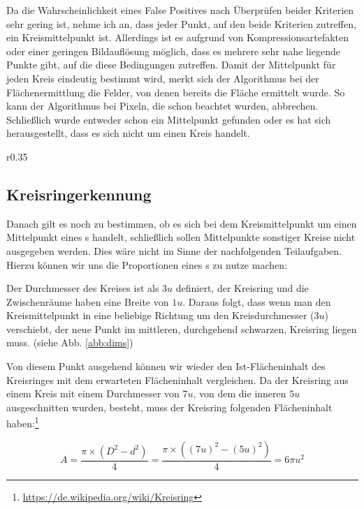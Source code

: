 Da die Wahrscheinlichkeit eines False Positives nach Überprüfen beider Kriterien sehr gering ist, nehme ich an, dass jeder Punkt, auf den beide Kriterien zutreffen, ein Kreismittelpunkt ist. 
Allerdings ist es aufgrund von Kompressionsartefakten oder einer geringen Bildauflösung möglich, dass es mehrere sehr nahe liegende Punkte gibt, auf die diese Bedingungen zutreffen. Damit der Mittelpunkt für jeden Kreis eindeutig bestimmt wird, merkt sich der Algorithmus bei der Flächenermittlung die Felder, von denen bereits die Fläche ermittelt wurde. 
So kann der Algorithmus bei Pixeln, die schon beachtet wurden, abbrechen. Schließlich wurde entweder schon ein Mittelpunkt gefunden oder es hat sich herausgestellt, dass es sich nicht um einen Kreis handelt.

\begin{wrapfigure}{r}{0.35\textwidth}
  \centering
  
  \caption{Größenverhältnisse}
  \label{abb:dims}
\end{wrapfigure}

\subsection{Kreisringerkennung}
Danach gilt es noch zu bestimmen, ob es sich bei dem Kreismittelpunkt um einen Mittelpunkt eines \task{}s handelt, schließlich sollen Mittelpunkte sonstiger Kreise nicht ausgegeben werden. Dies wäre nicht im Sinne der nachfolgenden Teilaufgaben. Hierzu können wir uns die Proportionen eines \task{}s zu nutze machen:

Der Durchmesser des Kreises ist als \(3u\) definiert, der Kreisring und die Zwischenräume haben eine Breite von \(1u\). 
Daraus folgt, dass wenn man den Kreismittelpunkt in eine beliebige Richtung um den Kreisdurchmesser (\(3u\)) verschiebt, der neue Punkt im mittleren, durchgehend schwarzen, Kreisring liegen muss. (siehe Abb. \ref{abb:dims})

Von diesem Punkt ausgehend können wir wieder den Ist-Flächeninhalt des Kreisringes mit dem erwarteten Flächeninhalt vergleichen. Da der Kreisring aus einem Kreis mit einem Durchmesser von \(7u\), von dem die inneren \(5u\) ausgeschnitten wurden, besteht, muss der Kreisring folgenden Flächeninhalt haben:\footnote{\url{https://de.wikipedia.org/wiki/Kreisring}}

\begin{equation}
	A=\frac{\pi{}\times(D^2-d^2)}{4}=\frac{\pi{}\times((7u)^2-(5u)^2)}{4}=6\pi{}u^2
\end{equation}

